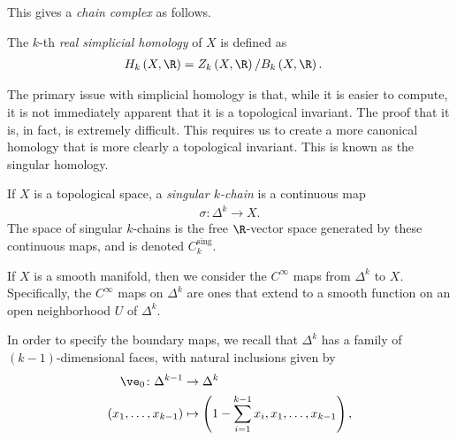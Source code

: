 \documentclass[10pt]{mypackage}
\renewcommand*{\mathbb}[1]{\varmathbb{#1}}
\begin{document}
This gives a \textit{chain complex} as follows.
\begin{center}
\end{center}
\begin{definition}
  The $k$-th \textit{real simplicial homology} of $X$ is defined as
  \begin{align*}
    H_{k}\left( X,\R \right) &= Z_k\left( X,\R \right)/B_k\left( X,\R \right).
  \end{align*}
\end{definition}
The primary issue with simplicial homology is that, while it is easier to compute, it is not immediately apparent that it is a topological invariant. The proof that it is, in fact, is extremely difficult. This requires us to create a more canonical homology that is more clearly a topological invariant. This is known as the singular homology.
\begin{definition}
  If $X$ is a topological space, a \textit{singular $k$-chain} is a continuous map
  \begin{align*}
    \sigma\colon \Delta^{k}\rightarrow X.
  \end{align*}
  The space of singular $k$-chains is the free $\R$-vector space generated by these continuous maps, and is denoted $C_k^{\operatorname{sing}}$.\newline

  If $X$ is a smooth manifold, then we consider the $C^{\infty}$ maps from $\Delta^{k}$ to $X$. Specifically, the $C^{\infty}$ maps on $\Delta^{k}$ are ones that extend to a smooth function on an open neighborhood $U$ of $\Delta^{k}$.
\end{definition}
In order to specify the boundary maps, we recall that $\Delta^{k}$ has a family of $\left( k-1 \right)$-dimensional faces, with natural inclusions given by
\begin{align*}
  \ve_0\colon \Delta^{k-1}&\rightarrow \Delta^{k}\\
  \left( x_1,\dots,x_{k-1} \right) &\mapsto \left( 1-\sum_{i=1}^{k-1}x_i,x_1,\dots,x_{k-1} \right),
\end{align*}
\end{document}
